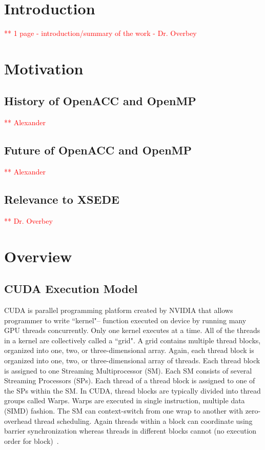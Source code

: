 \documentclass{sig-alternate-05-2015}
\newcommand\todo[1]{\textcolor{red}{** #1}}
\begin{document}

\section{Introduction}
\todo{1 page - introduction/summary of the work - Dr. Overbey}

\section{Motivation}
\subsection{History of OpenACC and OpenMP}
\todo{Alexander}
\subsection{Future of OpenACC and OpenMP}
\todo{Alexander}
\subsection{Relevance to XSEDE}
\todo{Dr. Overbey}

\section{Overview}
\subsection{CUDA Execution Model}
CUDA is parallel programming platform created by NVIDIA that allows programmer to write ``kernel"-- function executed on device by running many GPU threads concurrently. Only one kernel executes at a time. All of the threads in a kernel are collectively called a ``grid". A grid contains multiple thread blocks, organized into one, two, or three-dimensional array. Again, each thread block is organized into one, two, or three-dimensional array of threads. Each thread block is assigned to one Streaming Multiprocessor (SM). Each SM consists of several Streaming Processors (SPs). Each thread of a thread block is assigned to one of the SPs within the SM. In CUDA, thread blocks are typically divided into thread groups called Warps. Warps are executed in single instruction, multiple data (SIMD) fashion. The SM can context-switch from one wrap to another with zero-overhead thread scheduling. Again threads within a block can coordinate using barrier synchronization whereas threads in different blocks cannot (no execution order for block)~\cite{kirk2012programming}.
\end{document}
